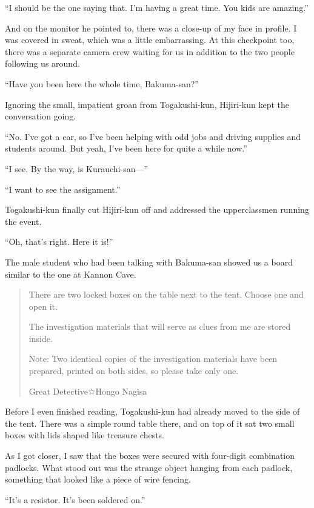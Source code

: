 \documentclass[
    a4paper,
    12pt,
    twoside,
    openany,
    UTF8,
    fontset=windows
]{ctexbook}
\begin{document}
``I should be the one saying that. I'm having a great time. You kids are amazing.''

And on the monitor he pointed to, there was a close-up of my face in profile. I was covered in sweat, which was a little embarrassing. At this checkpoint too, there was a separate camera crew waiting for us in addition to the two people following us around.

``Have you been here the whole time, Bakuma-san?''

Ignoring the small, impatient groan from Togakushi-kun, Hijiri-kun kept the conversation going.

``No. I've got a car, so I've been helping with odd jobs and driving supplies and students around. But yeah, I've been here for quite a while now.''

``I see. By the way, is Kurauchi-san---''

``I want to see the assignment.''

Togakushi-kun finally cut Hijiri-kun off and addressed the upperclassmen running the event.

``Oh, that's right. Here it is!''

The male student who had been talking with Bakuma-san showed us a board similar to the one at Kannon Cave.

\begin{quote}
There are two locked boxes on the table next to the tent. Choose one and open it.

The investigation materials that will serve as clues from me are stored inside.

Note: Two identical copies of the investigation materials have been prepared, printed on both sides, so please take only one.

\begin{flushright}
Great Detective☆Hongo Nagisa
\end{flushright}
\end{quote}

Before I even finished reading, Togakushi-kun had already moved to the side of the tent. There was a simple round table there, and on top of it sat two small boxes with lids shaped like treasure chests.

As I got closer, I saw that the boxes were secured with four-digit combination padlocks. What stood out was the strange object hanging from each padlock, something that looked like a piece of wire fencing.

``It's a resistor. It's been soldered on.''
\end{document}
